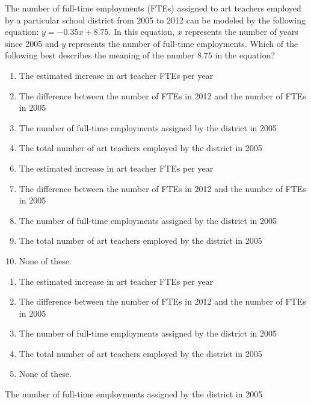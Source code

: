  
The number of full-time employments (FTEs) assigned to art teachers employed by a particular school district from 2005 to 2012 can be modeled by the following equation: $y=-0.35x+8.75$.  In this equation, $x$ represents the number of years since 2005 and $y$ represents the number of full-time employments.  Which of the following best describes the meaning of the number $8.75$ in the equation?


\ifsat
	\begin{enumerate}[label=\Alph*)]
		\item The estimated increase in art teacher FTEs per year
		\item The difference between the number of FTEs in 2012 and the number of FTEs in 2005
		\item The number of full-time employments assigned by the district in 2005 %
		\item The total number of art teachers employed by the district in 2005
	\end{enumerate}
\else
\fi

\ifacteven
	\begin{enumerate}[label=\textbf{\Alph*.},itemsep=\fill,align=left]
		\setcounter{enumii}{5}
		\item The estimated increase in art teacher FTEs per year
		\item The difference between the number of FTEs in 2012 and the number of FTEs in 2005
		\item The number of full-time employments assigned by the district in 2005 %
		\addtocounter{enumii}{1}
		\item The total number of art teachers employed by the district in 2005
		\item None of these. 
	\end{enumerate}
\else
\fi

\ifactodd
	\begin{enumerate}[label=\textbf{\Alph*.},itemsep=\fill,align=left]
		\item The estimated increase in art teacher FTEs per year
		\item The difference between the number of FTEs in 2012 and the number of FTEs in 2005
		\item The number of full-time employments assigned by the district in 2005 %
		\item The total number of art teachers employed by the district in 2005
		\item None of these. 
	\end{enumerate}
\else
\fi

\ifgridin
 The number of full-time employments assigned by the district in 2005 %
		
\else
\fi


